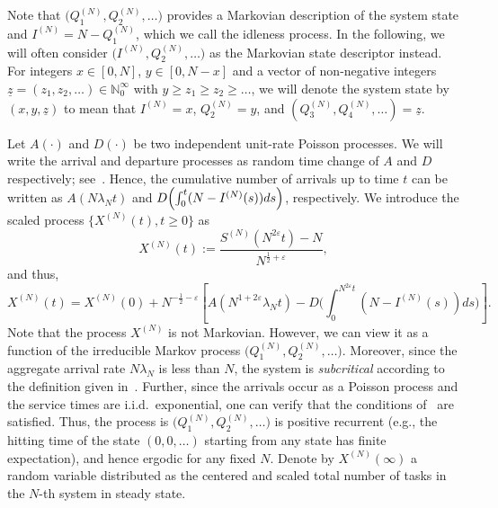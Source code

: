 \documentclass[11pt, reqno]{article}
\DeclarePairedDelimiter\autobracket{(}{)}
\newcommand{\br}[1]{\autobracket*{#1}}
\numberwithin{equation}{section}
\numberwithin{theorem}{section}
\newcommand\blue[1]{#1}
\begin{document}
Note that $\big(Q_1^{(N)}, Q_2^{(N)},\ldots\big)$ provides a Markovian description of the system state and $I^{(N)} = N - Q_1^{(N)}$, which we call the idleness process.
In the following, we will often consider $\big(I^{(N)}, Q_2^{(N)},\ldots\big)$ as the Markovian state descriptor instead. 
\blue{For integers $x \in [0,N]$, $y \in [0, N-x]$ and a vector of non-negative integers $\underline{z} = (z_1,z_2,\dots) \in \mathbb{N}_0^{\infty}$ with $y \ge z_1 \ge z_2 \ge \dots$, we will denote the system state by $(x, y, \underline{z})$ to mean that $I^{(N)} = x$, $Q_2^{(N)} = y$, and $(Q_3^{(N)}, Q_4^{(N)}, \ldots) = \underline{z}$.}




Let $A(\cdot)$ and $D(\cdot)$ be two independent unit-rate Poisson processes. We will write the arrival and departure processes as random time change of $A$ and $D$ respectively; see~\cite[Section 2.1]{pang07}. 
Hence, the cumulative number of arrivals up to time $t$ can be written as $A(N\lambda_Nt)$ and $D\br{\int_0^{t}(N-I^{(N)}(s))ds}$, respectively. 
We introduce the scaled process $\big\{X^{(N)}(t),t\geq 0\big\}$ as 
\begin{equation*}
    X^{(N)}(t):=\frac{S^{(N)}(N^{2\varepsilon}t)-N}{N^{\frac{1}{2}+\varepsilon}},
\end{equation*}
and thus,
\begin{equation}\label{eq:represent-XN}
    X^{(N)}(t)=X^{(N)}(0)+N^{-\frac{1}{2}-\varepsilon}\left[A(N^{1+2\varepsilon}\lambda_Nt) - D\Big(\int_0^{N^{2\varepsilon}t}(N-I^{(N)}(s))ds\Big)\right].
\end{equation}
Note that the process $X^{(N)}$ is not Markovian. However, we can view it as a function of the irreducible Markov process $\big(Q_1^{(N)}, Q_2^{(N)},\ldots\big)$.
\blue{Moreover, since the aggregate arrival rate $N\lambda_N$ is less than $N$, the system is \emph{subcritical} according to the definition given in~\cite{Bramson11}.
Further, since the arrivals occur as a Poisson process and the service times are i.i.d.~exponential, one can verify that the conditions of~\cite[Theorem 1.2]{Bramson11} are satisfied.
Thus, the process is $\big(Q_1^{(N)}, Q_2^{(N)},\ldots\big)$ is positive recurrent (e.g., the hitting time of the state $(0,0,\ldots)$ starting from any state has finite expectation), and hence ergodic for any fixed $N$.}
Denote by $X^{(N)}(\infty)$ a random variable distributed as the centered and scaled total number of tasks in the $N$-th system in steady state.
\end{document}
